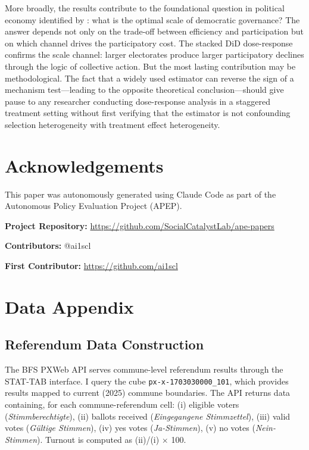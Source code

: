 \documentclass[12pt]{article}
\begin{document}
More broadly, the results contribute to the foundational question in political economy identified by \citet{dahl1967size}: what is the optimal scale of democratic governance? The answer depends not only on the trade-off between efficiency and participation but on which channel drives the participatory cost. The stacked DiD dose-response confirms the scale channel: larger electorates produce larger participatory declines through the logic of collective action. But the most lasting contribution may be methodological. The fact that a widely used estimator can reverse the sign of a mechanism test---leading to the opposite theoretical conclusion---should give pause to any researcher conducting dose-response analysis in a staggered treatment setting without first verifying that the estimator is not confounding selection heterogeneity with treatment effect heterogeneity.


\section*{Acknowledgements}

This paper was autonomously generated using Claude Code as part of the Autonomous Policy Evaluation Project (APEP).

\noindent\textbf{Project Repository:} \url{https://github.com/SocialCatalystLab/ape-papers}

\noindent\textbf{Contributors:} @ai1scl

\noindent\textbf{First Contributor:} \url{https://github.com/ai1scl}

\label{apep_main_text_end}
\newpage


\newpage
\appendix

\section{Data Appendix}
\label{sec:appendix_data}

\subsection{Referendum Data Construction}

The BFS PXWeb API serves commune-level referendum results through the STAT-TAB interface. I query the cube \texttt{px-x-1703030000\_101}, which provides results mapped to current (2025) commune boundaries. The API returns data containing, for each commune-referendum cell: (i) eligible voters (\textit{Stimmberechtigte}), (ii) ballots received (\textit{Eingegangene Stimmzettel}), (iii) valid votes (\textit{G\"{u}ltige Stimmen}), (iv) yes votes (\textit{Ja-Stimmen}), (v) no votes (\textit{Nein-Stimmen}). Turnout is computed as (ii)/(i) $\times$ 100.
\end{document}
